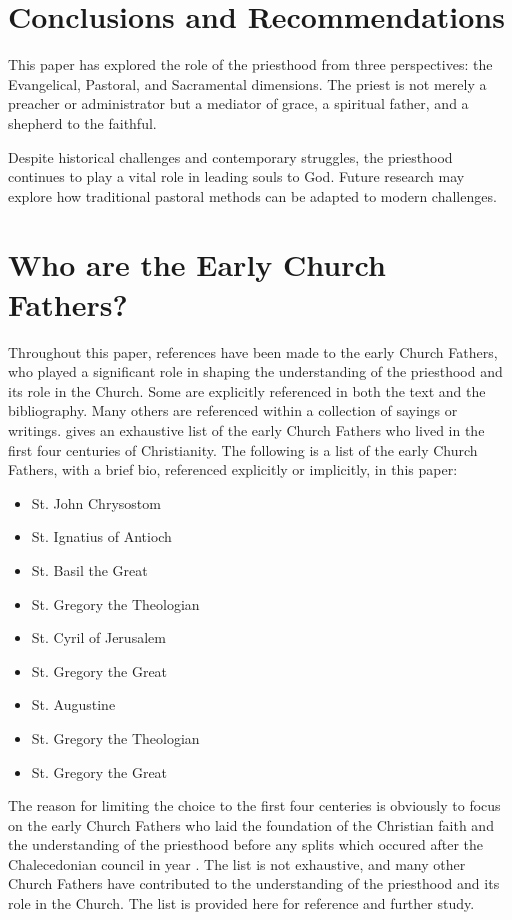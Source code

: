 \documentclass[12pt, doc]{apa7}   	%
\begin{document}
\section{Conclusions and Recommendations}

This paper has explored the role of the priesthood from three perspectives: the Evangelical, Pastoral, and Sacramental dimensions. The priest is not merely a preacher or administrator but a mediator of grace, a spiritual father, and a shepherd to the faithful. 

Despite historical challenges and contemporary struggles, the priesthood continues to play a vital role in leading souls to God. Future research may explore how traditional pastoral methods can be adapted to modern challenges.


\appendix{}
\section{Who are the Early Church Fathers?}\label{early_fathers}
Throughout this paper, references have been made to the early Church Fathers, who played a significant role in shaping the understanding of the priesthood and its role in the Church.  Some are explicitly referenced in both the text and the bibliography.  Many others are referenced within a collection of sayings or writings. \citet{early_church_akin} gives an exhaustive list of the early Church Fathers who lived in the first four centuries of Christianity.  The following is a list of the early Church Fathers, with a brief bio, referenced explicitly or implicitly, in this paper:

\begin{itemize}
    \item St. John Chrysostom
    \item St. Ignatius of Antioch
    \item St. Basil the Great
    \item St. Gregory the Theologian
    \item St. Cyril of Jerusalem
    \item St. Gregory the Great
    \item St. Augustine
    \item St. Gregory the Theologian
    \item St. Gregory the Great
\end{itemize}

The reason for limiting the choice to the first four centeries is obviously to focus on the early Church Fathers who laid the foundation of the Christian faith and the understanding of the priesthood before any splits which occured after the Chalecedonian council in year .  The list is not exhaustive, and many other Church Fathers have contributed to the understanding of the priesthood and its role in the Church.  The list is provided here for reference and further study.
\end{document}
